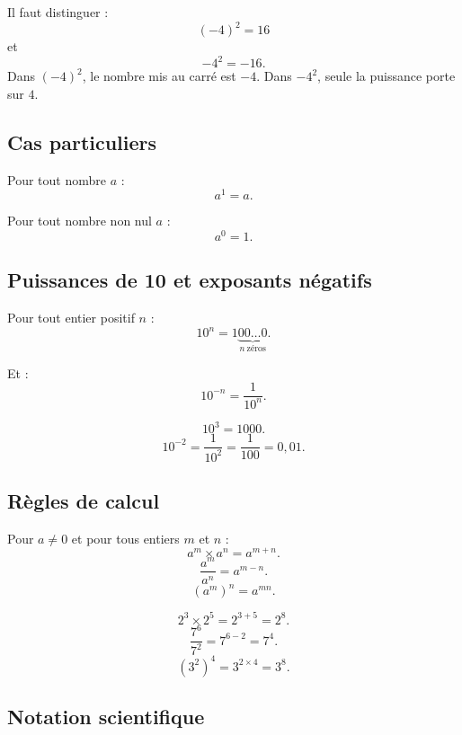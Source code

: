 \documentclass[11pt,a4paper]{article}
\begin{document}
\begin{attention}
Il faut distinguer :
\[
(-4)^2=16
\]
et
\[
-4^2=-16.
\]
Dans $(-4)^2$, le nombre mis au carré est $-4$.
Dans $-4^2$, seule la puissance porte sur $4$.
\end{attention}

\subsection{Cas particuliers}

\begin{propriete}
Pour tout nombre $a$ :
\[
a^1=a.
\]

Pour tout nombre non nul $a$ :
\[
a^0=1.
\]
\end{propriete}

\subsection{Puissances de 10 et exposants négatifs}

\begin{propriete}
Pour tout entier positif $n$ :
\[
10^n=1\underbrace{00\ldots0}_{n\ \text{zéros}}.
\]

Et :
\[
10^{-n}=\frac{1}{10^n}.
\]
\end{propriete}

\begin{exemple}
\[
10^3=1000.
\]
\[
10^{-2}=\frac{1}{10^2}=\frac{1}{100}=0{,}01.
\]
\end{exemple}

\subsection{Règles de calcul}

\begin{propriete}
Pour $a\neq0$ et pour tous entiers $m$ et $n$ :
\[
a^m\times a^n=a^{m+n}.
\]
\[
\frac{a^m}{a^n}=a^{m-n}.
\]
\[
(a^m)^n=a^{mn}.
\]
\end{propriete}

\begin{exemple}
\[
2^3\times2^5=2^{3+5}=2^8.
\]
\[
\frac{7^6}{7^2}=7^{6-2}=7^4.
\]
\[
(3^2)^4=3^{2\times4}=3^8.
\]
\end{exemple}

\subsection{Notation scientifique}
\end{document}
